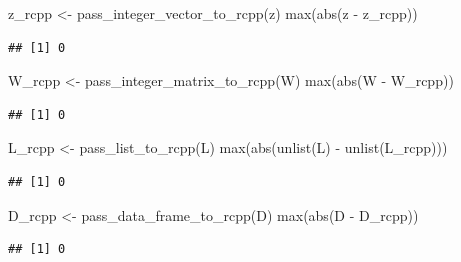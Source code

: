 \documentclass[
]{book}
\newenvironment{Shaded}{\begin{snugshade}}{\end{snugshade}}
\newcommand{\FunctionTok}[1]{\textcolor[rgb]{0.00,0.00,0.00}{#1}}
\newcommand{\NormalTok}[1]{#1}
\newcommand{\OtherTok}[1]{\textcolor[rgb]{0.56,0.35,0.01}{#1}}
\newcommand{\SpecialCharTok}[1]{\textcolor[rgb]{0.00,0.00,0.00}{#1}}
\begin{document}
\begin{Shaded}
\begin{Highlighting}[]
\NormalTok{z\_rcpp }\OtherTok{\textless{}{-}} \FunctionTok{pass\_integer\_vector\_to\_rcpp}\NormalTok{(z)}
\FunctionTok{max}\NormalTok{(}\FunctionTok{abs}\NormalTok{(z }\SpecialCharTok{{-}}\NormalTok{ z\_rcpp))}
\end{Highlighting}
\end{Shaded}

\begin{verbatim}
## [1] 0
\end{verbatim}

\begin{Shaded}
\begin{Highlighting}[]
\NormalTok{W\_rcpp }\OtherTok{\textless{}{-}} \FunctionTok{pass\_integer\_matrix\_to\_rcpp}\NormalTok{(W)}
\FunctionTok{max}\NormalTok{(}\FunctionTok{abs}\NormalTok{(W }\SpecialCharTok{{-}}\NormalTok{ W\_rcpp))}
\end{Highlighting}
\end{Shaded}

\begin{verbatim}
## [1] 0
\end{verbatim}

\begin{Shaded}
\begin{Highlighting}[]
\NormalTok{L\_rcpp }\OtherTok{\textless{}{-}} \FunctionTok{pass\_list\_to\_rcpp}\NormalTok{(L)}
\FunctionTok{max}\NormalTok{(}\FunctionTok{abs}\NormalTok{(}\FunctionTok{unlist}\NormalTok{(L) }\SpecialCharTok{{-}} \FunctionTok{unlist}\NormalTok{(L\_rcpp)))}
\end{Highlighting}
\end{Shaded}

\begin{verbatim}
## [1] 0
\end{verbatim}

\begin{Shaded}
\begin{Highlighting}[]
\NormalTok{D\_rcpp }\OtherTok{\textless{}{-}} \FunctionTok{pass\_data\_frame\_to\_rcpp}\NormalTok{(D)}
\FunctionTok{max}\NormalTok{(}\FunctionTok{abs}\NormalTok{(D }\SpecialCharTok{{-}}\NormalTok{ D\_rcpp))}
\end{Highlighting}
\end{Shaded}

\begin{verbatim}
## [1] 0
\end{verbatim}
\end{document}
